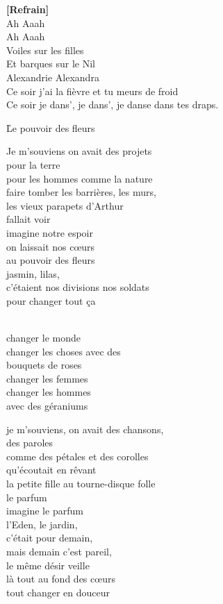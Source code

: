 \documentclass{novel}
\begin{document}
\begin{multicols}{2}
\textbf{[Refrain]} \\

Ah Aaah \\
Ah Aaah \\

Voiles sur les filles \\
Et barques sur le Nil \\
Alexandrie Alexandra \\
Ce soir j'ai la fièvre et tu meurs de froid \\
Ce soir je dans', je dans', je danse dans tes draps. \\
\end{multicols}

\newpage
\normalsize

\h*{Le pouvoir des fleurs}

\begin{multicols}{2}
Je m'souviens on avait des projets \\
pour la terre \\
pour les hommes comme la nature \\
faire tomber les barrières, les murs, \\
les vieux parapets d'Arthur \\
fallait voir \\
imagine notre espoir \\
on laissait nos cœurs \\
au pouvoir des fleurs \\
jasmin, lilas, \\
c'étaient nos divisions nos soldats \\
pour changer tout ça \\

\begin{bfseries}
[Refrain:]\\
changer le monde \\
changer les choses avec des \\
bouquets de roses \\
changer les femmes \\
changer les hommes \\
avec des géraniums \\
\end{bfseries}

je m'souviens, on avait des chansons, \\
des paroles \\
comme des pétales et des corolles \\
qu'écoutait en rêvant \\
la petite fille au tourne-disque folle \\
le parfum \\
imagine le parfum \\
l'Eden, le jardin, \\
c'était pour demain, \\
mais demain c'est pareil, \\
le même désir veille \\
là tout au fond des cœurs \\
tout changer en douceur \\


\end{multicols}
\end{document}
